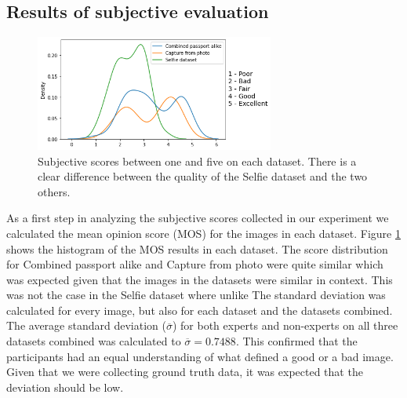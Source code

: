 

\subsection{Results of subjective evaluation}
\label{sec:SubAssessment}

\begin{figure}[h]
    \centering
    \includegraphics[width=0.7\textwidth]{figures/KernelPlots.png}
    \caption{Subjective scores between one and five on each dataset. There is a clear difference between the quality of the Selfie dataset and the two others.}
    \label{fig:kerneldensity}
\end{figure}

As a first step in analyzing the subjective scores collected in our experiment we calculated the mean opinion score (MOS) for the images in each dataset. Figure \ref{fig:kerneldensity} shows the histogram of the MOS results in each dataset. The score distribution for Combined passport alike and Capture from photo were quite similar which was expected given that the images in the datasets were similar in context. This was not the case in the Selfie dataset where unlike  The standard deviation was calculated for every image, but also for each dataset and the datasets combined. The average standard deviation ($\overline{\sigma}$) for both experts and non-experts on all three datasets combined was calculated to $\overline{\sigma} = 0.7488$. This confirmed that the participants had an equal understanding of what defined a good or a bad image. Given that we were collecting ground truth data, it was expected that the deviation should be low.   


